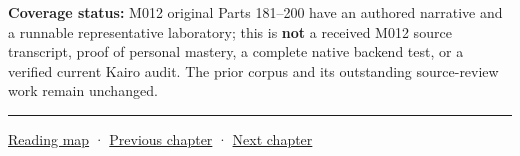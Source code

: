 \textbf{Coverage status:} M012 original Parts 181--200 have an authored narrative and a runnable representative laboratory; this is \textbf{not} a received M012 source transcript, proof of personal mastery, a complete native backend test, or a verified current Kairo audit. The prior corpus and its outstanding source-review work remain unchanged.

\begin{center}\rule{0.5\linewidth}{0.5pt}\end{center}

\hyperref[volume-reading-map]{Reading map} · \hyperref[05-engine-i-ch003-object-representation-lifetime-and-enforceable-promises]{Previous chapter} · \hyperref[05-engine-i-ch005-generic-asset-pipelines-with-stable-identity]{Next chapter}
